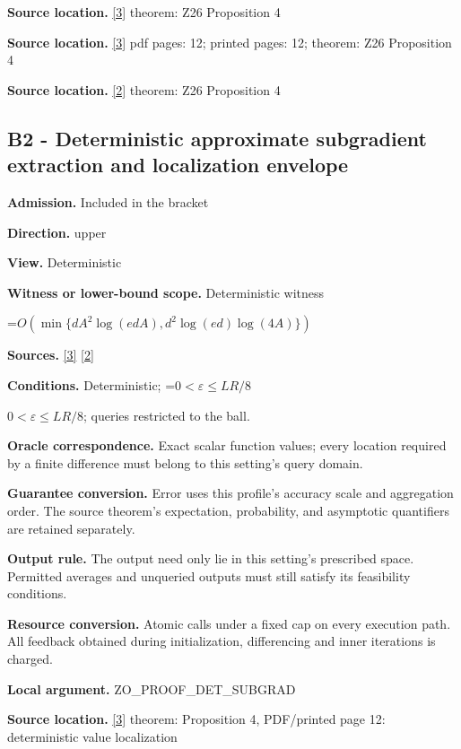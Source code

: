 \documentclass[10pt,a4paper]{article}
\newcommand{\AtlasMath}[1]{\par\begingroup\centering\setbox0=\hbox{$\displaystyle #1$}\ifdim\wd0>1.4\linewidth\typeout{ATLAS WIDE FORMULA: \the\wd0}\fi\ifdim\wd0>\linewidth\resizebox{\linewidth}{!}{\box0}\else\box0\fi\par\endgroup}
\newcommand{\AtlasInlineMath}[1]{\begingroup\setbox0=\hbox{$#1$}\ifdim\wd0>.4\linewidth\endgroup\AtlasMath{#1}\else\endgroup$#1$\fi}
\begin{document}
\textbf{Source location.} \href{https://arxiv.org/html/2607.16558v2}{[3]} theorem: Z26 Proposition 4

\textbf{Source location.} \href{https://arxiv.org/html/2607.16558v2}{[3]} pdf pages: 12; printed pages: 12; theorem: Z26 Proposition 4

\textbf{Source location.} \href{https://www.mathnet.ru/php/archive.phtml?jrnid=mzm&option_lang=eng&paperid=1697&wshow=paper}{[2]} theorem: Z26 Proposition 4

\subsection{B2 - Deterministic approximate subgradient extraction and localization envelope}
\textbf{Admission.} Included in the bracket

\textbf{Direction.} upper

\textbf{View.} Deterministic

\textbf{Witness or lower-bound scope.} Deterministic witness

\AtlasMath{O\!\left(\min\{dA^2\log(edA),d^2\log(ed)\log(4A)\}\right)}
\textbf{Sources.} \href{https://arxiv.org/html/2607.16558v2}{[3]} \href{https://www.mathnet.ru/php/archive.phtml?jrnid=mzm&option_lang=eng&paperid=1697&wshow=paper}{[2]}

\textbf{Conditions.} Deterministic; \AtlasInlineMath{0<\varepsilon\le LR/8}; queries restricted to the ball.

\textbf{Oracle correspondence.} Exact scalar function values; every location required by a finite difference must belong to this setting's query domain.

\textbf{Guarantee conversion.} Error uses this profile's accuracy scale and aggregation order. The source theorem's expectation, probability, and asymptotic quantifiers are retained separately.

\textbf{Output rule.} The output need only lie in this setting's prescribed space. Permitted averages and unqueried outputs must still satisfy its feasibility conditions.

\textbf{Resource conversion.} Atomic calls under a fixed cap on every execution path. All feedback obtained during initialization, differencing and inner iterations is charged.

\textbf{Local argument.} ZO\_\allowbreak{}PROOF\_\allowbreak{}DET\_\allowbreak{}SUBGRAD

\textbf{Source location.} \href{https://arxiv.org/html/2607.16558v2}{[3]} theorem: Proposition 4, PDF/printed page 12: deterministic value localization
\end{document}
